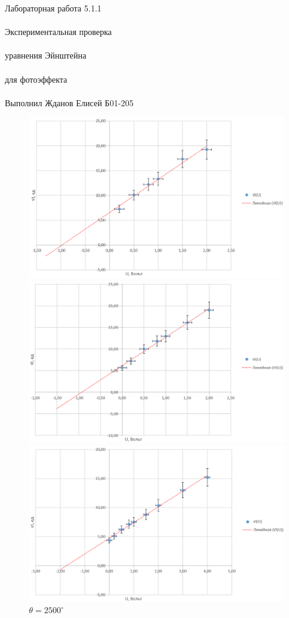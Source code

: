 \documentclass{astroedu-lab}
\begin{document}
\begin{problem}{\huge Лабораторная работа 5.1.1\\\\Экспериментальная проверка\\\\ уравнения Эйнштейна\\\\
для фотоэффекта\\\\Выполнил Жданов Елисей Б01-205}
\begin{figure}[h!]
\begin{minipage}[b]{0.48\textwidth}
        \includegraphics[width=\textwidth]{p/2024-09-29_01-18-56.png}
        \caption{$\theta = 2700^\circ$}
        \label{fig:11}
    \end{minipage}
    \hfill
    \begin{minipage}[b]{0.48\textwidth}
        \centering
        \includegraphics[width=\textwidth]{p/2024-09-29_01-21-15.png}
        \caption{$\theta = 2500^\circ$}
        \label{fig:11}
    \end{minipage}
    \hfill
    \begin{minipage}[b]{0.48\textwidth}
        \centering
        \includegraphics[width=\textwidth]{p/2024-09-29_01-24-25.png}

\end{minipage}
\end{figure}
\end{problem}
\end{document}
